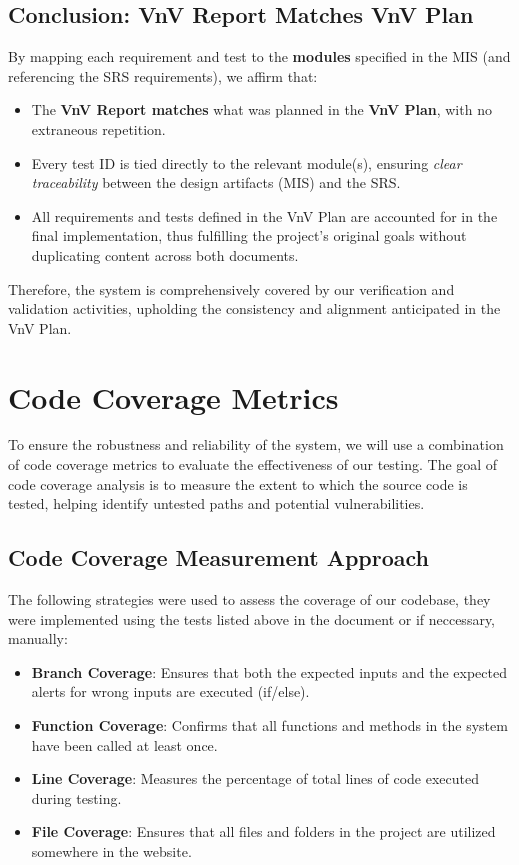 \documentclass[12pt, titlepage]{article}
\begin{document}
\subsection{Conclusion: VnV Report Matches VnV Plan}

By mapping each requirement and test to the \textbf{modules} specified
in the MIS (and referencing the SRS requirements), we affirm that:
\begin{itemize}
  \item The \textbf{VnV Report matches} what was planned in the \textbf{VnV Plan}, with
  no extraneous repetition. 
  \item Every test ID is tied directly to the relevant module(s), ensuring
  \emph{clear traceability} between the design artifacts (MIS) and the SRS.
  \item All requirements and tests defined in the VnV Plan are accounted for in
  the final implementation, thus fulfilling the project’s original goals without
  duplicating content across both documents.
\end{itemize}

Therefore, the system is comprehensively covered by our verification and validation
activities, upholding the consistency and alignment anticipated in the VnV Plan. 


\section{Code Coverage Metrics}

To ensure the robustness and reliability of the \progname{} system, we will use a combination of code coverage metrics to evaluate the effectiveness of our testing. The goal of code coverage analysis is to measure the extent to which the source code is tested, helping identify untested paths and potential vulnerabilities.

\subsection{Code Coverage Measurement Approach}
The following strategies were used to assess the coverage of our codebase, they were implemented using the tests listed above in the document or if neccessary, manually:

\begin{itemize}
    \item \textbf{Branch Coverage}: Ensures that both the expected inputs and the expected alerts for wrong inputs are executed (if/else).
    \item \textbf{Function Coverage}: Confirms that all functions and methods in the system have been called at least once.
    \item \textbf{Line Coverage}: Measures the percentage of total lines of code executed during testing.
    \item \textbf{File Coverage}: Ensures that all files and folders in the project are utilized somewhere in the website.
\end{itemize}
\end{document}
